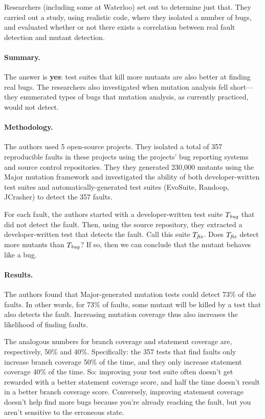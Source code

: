 \documentclass[11pt]{article}
\begin{document}
Researchers (including some at Waterloo) set out to determine just that. They carried out a
study, using realistic code, where they isolated a number of bugs, and
evaluated whether or not there exists a correlation between real fault
detection and mutant detection.

\paragraph{Summary.} The answer is {\bf yes}: test suites
that kill more mutants are also better at finding real bugs. The
researchers also investigated when mutation analysis fell short---they
enumerated types of bugs that mutation analysis, as currently
practiced, would not detect.

\paragraph{Methodology.} The authors used 5 open-source projects.
They isolated a total of 357 reproducible faults in these projects
using the projects' bug reporting systems and source control
repositories. They they generated 230,000 mutants using the
Major mutation framework and investigated the ability of
both developer-written test suites and automatically-generated
test suites (EvoSuite, Randoop, JCrasher) to detect the 357 faults.

For each fault, the authors started with a developer-written test
suite $T_{\mbox{\em \scriptsize bug}}$ that did not detect the fault. Then, using
the source repository, they extracted a developer-written test that
detects the fault. Call this suite $T_{\mbox{\em \scriptsize fix}}$. Does
$T_{\mbox{\em \scriptsize fix}}$ detect more mutants than $T_{\mbox{\em \scriptsize bug}}$?
If so, then we can conclude that the mutant behaves like a bug.

\paragraph{Results.} The authors found that Major-generated mutation
tests could detect 73\% of the faults.  In other words, for 73\% of
faults, some mutant will be killed by a test that also detects the
fault. Increasing mutation coverage thus also increases the likelihood
of finding faults.

The analogous numbers for branch coverage and statement coverage are,
respectively, 50\% and 40\%. Specifically: the 357 tests that find
faults only increase branch coverage 50\% of the time, and they only
increase statement coverage 40\% of the time. So: improving your test
suite often doesn't get rewarded with a better statement coverage
score, and half the time doesn't result in a better branch coverage
score. Conversely, improving statement coverage doesn't help find more bugs because
you're already reaching the fault, but you aren't sensitive to the erroneous state.
\end{document}
